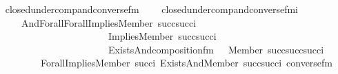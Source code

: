 \begin{isabellebody}
%
\isadelimproof
\ \isanewline
%
\endisadelimproof
{}\isamarkupfalse%
\ closed{\isacharunderscore}{\kern0pt}under{\isacharunderscore}{\kern0pt}comp{\isacharunderscore}{\kern0pt}and{\isacharunderscore}{\kern0pt}converse{\isacharunderscore}{\kern0pt}fm\ \ \isanewline
\ \ {\isachardoublequoteopen}closed{\isacharunderscore}{\kern0pt}under{\isacharunderscore}{\kern0pt}comp{\isacharunderscore}{\kern0pt}and{\isacharunderscore}{\kern0pt}converse{\isacharunderscore}{\kern0pt}fm{\isacharparenleft}{\kern0pt}i{\isacharparenright}{\kern0pt}\ {\isasymequiv}\ \isanewline
\ \ \ \ \ \ And{\isacharparenleft}{\kern0pt}Forall{\isacharparenleft}{\kern0pt}Forall{\isacharparenleft}{\kern0pt}Implies{\isacharparenleft}{\kern0pt}Member{\isacharparenleft}{\kern0pt}{}{\isacharcomma}{\kern0pt}\ succ{\isacharparenleft}{\kern0pt}succ{\isacharparenleft}{\kern0pt}i{\isacharparenright}{\kern0pt}{\isacharparenright}{\kern0pt}{\isacharparenright}{\kern0pt}{\isacharcomma}{\kern0pt}\isanewline
\ \ \ \ \ \ \ \ \ \ \ \ \ \ \ \ \ \ \ \ \ \ \ \ Implies{\isacharparenleft}{\kern0pt}Member{\isacharparenleft}{\kern0pt}{}{\isacharcomma}{\kern0pt}\ succ{\isacharparenleft}{\kern0pt}succ{\isacharparenleft}{\kern0pt}i{\isacharparenright}{\kern0pt}{\isacharparenright}{\kern0pt}{\isacharparenright}{\kern0pt}{\isacharcomma}{\kern0pt}\ \isanewline
\ \ \ \ \ \ \ \ \ \ \ \ \ \ \ \ \ \ \ \ \ \ \ \ Exists{\isacharparenleft}{\kern0pt}And{\isacharparenleft}{\kern0pt}composition{\isacharunderscore}{\kern0pt}fm{\isacharparenleft}{\kern0pt}{}{\isacharcomma}{\kern0pt}\ {}{\isacharcomma}{\kern0pt}\ {}{\isacharparenright}{\kern0pt}{\isacharcomma}{\kern0pt}\ Member{\isacharparenleft}{\kern0pt}{}{\isacharcomma}{\kern0pt}\ succ{\isacharparenleft}{\kern0pt}succ{\isacharparenleft}{\kern0pt}succ{\isacharparenleft}{\kern0pt}i{\isacharparenright}{\kern0pt}{\isacharparenright}{\kern0pt}{\isacharparenright}{\kern0pt}{\isacharparenright}{\kern0pt}{\isacharparenright}{\kern0pt}{\isacharparenright}{\kern0pt}{\isacharparenright}{\kern0pt}{\isacharparenright}{\kern0pt}{\isacharparenright}{\kern0pt}{\isacharparenright}{\kern0pt}{\isacharcomma}{\kern0pt}\ \isanewline
\ \ \ \ \ \ \ \ \ \ Forall{\isacharparenleft}{\kern0pt}Implies{\isacharparenleft}{\kern0pt}Member{\isacharparenleft}{\kern0pt}{}{\isacharcomma}{\kern0pt}\ succ{\isacharparenleft}{\kern0pt}i{\isacharparenright}{\kern0pt}{\isacharparenright}{\kern0pt}{\isacharcomma}{\kern0pt}\ Exists{\isacharparenleft}{\kern0pt}And{\isacharparenleft}{\kern0pt}Member{\isacharparenleft}{\kern0pt}{}{\isacharcomma}{\kern0pt}\ succ{\isacharparenleft}{\kern0pt}succ{\isacharparenleft}{\kern0pt}i{\isacharparenright}{\kern0pt}{\isacharparenright}{\kern0pt}{\isacharparenright}{\kern0pt}{\isacharcomma}{\kern0pt}\ converse{\isacharunderscore}{\kern0pt}fm{\isacharparenleft}{\kern0pt}{}{\isacharcomma}{\kern0pt}\ {}{\isacharparenright}{\kern0pt}{\isacharparenright}{\kern0pt}{\isacharparenright}{\kern0pt}{\isacharparenright}{\kern0pt}{\isacharparenright}{\kern0pt}{\isacharparenright}{\kern0pt}{\isachardoublequoteclose}\ \isanewline

\end{isabellebody}

